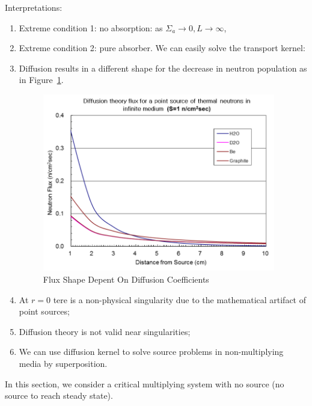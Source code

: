 \documentclass{school-22.211-notes}
\begin{document}
Interpretations:
\begin{enumerate}
\item Extreme condition 1: no absorption: as $\Sigma_a \to 0, L\to \infty$, 
\item Extreme condition 2: pure absorber. We can easily solve the transport kernel: 
\item Diffusion results in a different shape for the decrease in neutron population as in Figure~\ref{dfs-shape}.
  \begin{figure}
    \centering
    \includegraphics[width=4in]{images/dfs/dfs-shape.png}
    \caption{Flux Shape Depent On Diffusion Coefficients}\label{dfs-shape}
  \end{figure}
\item At $r=0$ tere is a non-physical singularity due to the mathematical artifact of point sources;
\item Diffusion theory is not valid near singularities;
\item We can use diffusion kernel to solve source problems in non-multiplying media by superposition.
\end{enumerate}




 \label{1g-criticality}
In this section, we consider a critical multiplying system with no source (no source to reach steady state). 
\end{document}
